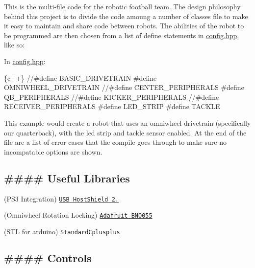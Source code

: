 This is the multi-\/file code for the robotic football team. The design philosophy behind this project is to divide the code amoung a number of classes file to make it easy to maintain and share code between robots. The abilities of the robot to be programmed are then chosen from a list of define statements in \mbox{\hyperlink{_config_8hpp_source}{config.\+hpp}}, like so\+:

In \mbox{\hyperlink{_config_8hpp_source}{config.\+hpp}}\+: 
\begin{DoxyCode}
\{c++\}
//#define BASIC\_DRIVETRAIN
#define OMNIWHEEL\_DRIVETRAIN
//#define CENTER\_PERIPHERALS
#define QB\_PERIPHERALS
//#define KICKER\_PERIPHERALS
//#define RECEIVER\_PERIPHERALS
#define LED\_STRIP
#define TACKLE
\end{DoxyCode}
 This example would create a robot that uses an omniwheel drivetrain (specifically our quarterback), with the led strip and tackle sensor enabled. At the end of the file are a list of error cases that the compile goes through to make sure no incompatable options are shown.

\subsection*{\#\#\#\# Useful Libraries }


\begin{DoxyEnumerate}
\item (P\+S3 Integration) \href{https://github.com/felis/USB_Host_Shield_2.0}{\tt U\+SB Host\+Shield 2.}
\item (Omniwheel Rotation Locking) \href{https://github.com/adafruit/Adafruit_BNO055}{\tt Adafruit B\+N\+O055}
\item (S\+TL for arduino) \href{https://github.com/maniacbug/StandardCplusplus}{\tt Standard\+Cplusplus}
\end{DoxyEnumerate}

\subsection*{\#\#\#\# Controls }


